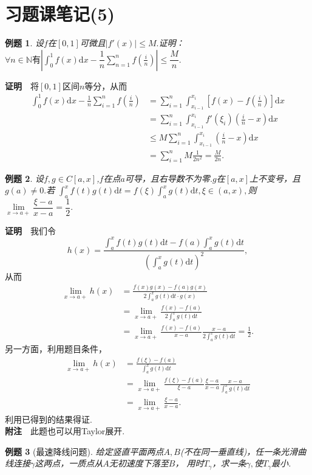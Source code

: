 \documentclass[UTF8]{article}
\newcommand{\dx}{\mathrm{d}x}
\newcommand{\zm}{\textbf{证明}$\quad$}
\newcommand{\fz}{\textbf{附注}$\quad$}
\newtheorem{exa}{\hspace{2em}例题}[section]
\begin{document}
\section{习题课笔记(5)}
\begin{exa}
  设$f$在$[0,1]$可微且$|f'(x)|\le M.$证明：$\forall n\in\mathbb{N}有\left|\int_0^1f(x)\dx-
  \dfrac{1}{n}\sum\limits_{n=1}^nf(\frac{i}{n})\right|\le\dfrac{M}{n}.$
\end{exa}
\zm 将$[0,1]$区间$n$等分，从而
\begin{align*}
  \int_0^1f(x)\dx-\frac{1}{n}\sum_{i=1}^nf(\frac{i}{n})&=\sum_{i=1}^n\int_{x_{i-1}}^{x_i}[f(x)
  -f(\frac{i}{n})]\dx\\
  &=\sum_{i=1}^n\int_{x_{i-1}}^{x_i}f'(\xi_i)(\frac{i}{n}-x)\dx\\
  &\le M\sum_{i=1}^n\int_{x_{i-1}}^{x_i}(\frac{i}{n}-x)\dx\\
  &=\sum_{i=1}^n M\frac{1}{2n^2}=\frac{M}{2n}.
\end{align*}
\begin{exa}
  设$f,g\in C[a,x]$,$f$在点$a$可导，且右导数不为零.$g$在$[a,x]$上不变号，且$g(a)\ne0.$若
  $\int_a^xf(t)g(t)\mathrm{d}t=f(\xi)\int_a^xg(t)\mathrm{d}t,\xi\in(a,x),$则$\lim\limits_{x\to a+}\dfrac{\xi-a}{x-a}=
  \dfrac{1}{2}.$
\end{exa}
\zm 我们令
$$h(x)=\frac{\int_a^xf(t)g(t)\mathrm{d}t-f(a)\int_a^xg(t)\mathrm{d}t}{\left(\int_a^xg(t)\mathrm{d}t\right)^2},$$
从而
\begin{align*}
  \lim_{x\to a+}h(x)&=\frac{f(x)g(x)-f(a)g(x)}{2\int_a^xg(t)\mathrm{d}t\cdot g(x)}\\
  &=\lim_{x\to a+}\frac{f(x)-f(a)}{2\int_a^xg(t)\mathrm{d}t}\\
  &=\lim_{x\to a+}\frac{f(x)-f(a)}{x-a}\frac{x-a}{2\int_a^xg(t)\mathrm{d}t}=\frac{1}{2}.
\end{align*}
另一方面，利用题目条件，
\begin{align*}
  \lim_{x\to a+}h(x)&=\frac{f(\xi)-f(a)}{\int_a^xg(t)\mathrm{d}t}\\
  &=\lim_{x\to a+}\frac{f(\xi)-f(a)}{\xi-a}\frac{\xi-a}{x-a}\frac{x-a}{\int_a^xg(t)\mathrm{d}t}\\
  &=\lim_{x\to a+}\frac{\xi-a}{x-a}.
\end{align*}
利用已得到的结果得证.\\
\fz 此题也可以用Taylor展开.
\begin{exa}[最速降线问题]
  给定竖直平面两点$A,B$(不在同一垂直线)，任一条光滑曲线连接$\gamma$这两点，一质点从$A$无初速度下落至$B$，
  用时$T_\gamma$，求一条$\gamma,$使$T_\gamma$最小.
\end{exa}
\end{document}
